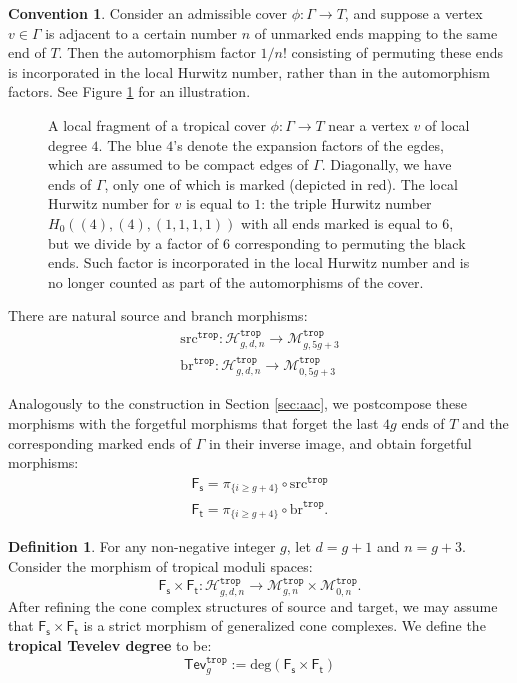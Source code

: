 \documentclass[11pt,reqno]{amsart}
\newcommand{\inputTikZ}[2]{%
     \resizebox{#1}{!}{}}
\theoremstyle{definition}
\newtheorem{definition}[theorem]{Definition}
\newtheorem{convention}[theorem]{Convention}
\newcommand\trop{{\mathtt{trop}}}
\newcommand{\dg}{\mathrm{deg}}
\newcommand\Mgn[1]{\mathcal M_{#1}}
\newcommand\Hur[1]{\mathcal H_{#1}}
\newcommand\br{\mathrm{br}}
\newcommand\src{\mathrm{src}}
\newcommand{\Ft}{\mathsf{F_t}}
\newcommand{\Fs}{\mathsf{F_s}}
\newcommand{\Tev}{{\mathsf{Tev}}}
\begin{document}
\begin{convention}\label{conv:lochurnum}
    Consider an admissible cover $\phi:\Gamma\to T$, and suppose a vertex $v\in \Gamma$ is adjacent to a certain number $n$ of unmarked ends mapping to the same end of $T$. Then the automorphism factor $1/n!$ consisting of permuting these ends is incorporated in the local Hurwitz number, rather than in the automorphism factors. See Figure \ref{fig:lochur} for an illustration. 
 \end{convention}

 \begin{figure}[tb]
     \centering
\inputTikZ{.5\textwidth}{Figures/lochur}
     \caption{A local fragment of a tropical cover $\phi:\Gamma \to T$ near a vertex $v$ of local degree $4$. The blue $4$'s denote the expansion factors of the egdes, which are assumed to be compact edges of $\Gamma$. Diagonally, we have ends of $\Gamma$, only one of which is marked (depicted in red). The local Hurwitz number for $v$ is equal to $1$: the triple Hurwitz number $H_0((4),(4),(1,1,1,1))$ with all ends marked is equal to $6$, but we divide by a factor of $6$ corresponding to permuting the black ends. Such factor is incorporated in the local Hurwitz number and is no longer counted as part of the automorphisms of the cover.}
     \label{fig:lochur}
 \end{figure}

There are natural source and branch morphisms:
\begin{align}
    \src^\trop: \Hur{g,d,n}^\trop \to \Mgn{g,5g+3}^\trop \nonumber\\
    \br^\trop: \Hur{g,d,n}^\trop \to \Mgn{0,5g+3}^\trop
\end{align}

Analogously to the construction in Section \ref{sec:aac}, we postcompose these morphisms with the forgetful morphisms that forget the last $4g$ ends of $T$ and the corresponding marked ends of $\Gamma$ in their inverse image, and obtain forgetful morphisms:
\begin{align}
   \Fs = \pi_{\{i\geq g+4\}}\circ \src^\trop \nonumber\\
   \Ft = \pi_{\{i\geq g+4\}}\circ \br^\trop.
\end{align}

\begin{definition}\label{def:troptev}
For any non-negative
integer $g$, let $d = g+1$ and $n = g+3$.
Consider the morphism of tropical moduli spaces:
\begin{equation}
    \Fs\times \Ft: \Hur{g,d,n}^\trop \to \Mgn{g,n}^\trop \times \Mgn{0,n}^\trop.
\end{equation}
After refining the cone complex structures of source and target, we may assume that $\Fs\times \Ft$ is a strict morphism of generalized cone complexes. We define the {\bf tropical Tevelev degree} to be:
\begin{equation}
    \Tev^\trop_g:={\dg (\Fs\times \Ft)}
\end{equation}
\end{definition}
   
\end{document}
